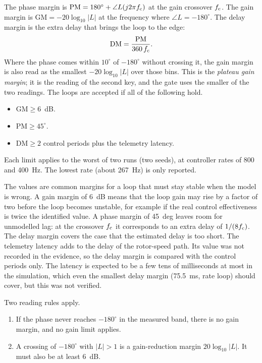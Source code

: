 The phase margin is $\mathrm{PM}=180^\circ+\angle L(j2\pi f_{\mathrm{c}})$ at the gain crossover $f_{\mathrm{c}}$.
The gain margin is $\mathrm{GM}=-20\log_{10}|L|$ at the frequency where $\angle L=-180^\circ$.
The delay margin is the extra delay that brings the loop to the edge:
\begin{equation}\label{eq:an_dm}
  \mathrm{DM} = \frac{\mathrm{PM}}{360\,f_{\mathrm{c}}} .
\end{equation}
Where the phase comes within $10^\circ$ of $-180^\circ$ without crossing it, the gain margin is also read as the smallest $-20\log_{10}|L|$ over those bins.
This is the \emph{plateau gain margin}; it is the reading of the second key, and the gate uses the smaller of the two readings.
The loops are accepted if all of the following hold.
\begin{itemize}
  \item $\mathrm{GM}\ge 6$~dB.
  \item $\mathrm{PM}\ge 45^\circ$.
  \item $\mathrm{DM}\ge 2$ control periods plus the telemetry latency.
\end{itemize}
Each limit applies to the worst of two runs (two seeds), at controller rates of 800 and 400~Hz.
The lowest rate (about 267~Hz) is only reported.

The values are common margins for a loop that must stay stable when the model is wrong.
A gain margin of 6~dB means that the loop gain may rise by a factor of two before the loop becomes unstable, for example if the real control effectiveness is twice the identified value.
A phase margin of 45~deg leaves room for unmodelled lag: at the crossover $f_{\mathrm{c}}$ it corresponds to an extra delay of $1/(8f_{\mathrm{c}})$.
The delay margin covers the case that the estimated delay is too short.
The telemetry latency adds to the delay of the rotor-speed path.
Its value was not recorded in the evidence, so the delay margin is compared with the control periods only.
The latency is expected to be a few tens of milliseconds at most in the simulation, which even the smallest delay margin (75.5~ms, rate loop) should cover, but this was not verified.

Two reading rules apply.
\begin{enumerate}
  \item If the phase never reaches $-180^\circ$ in the measured band, there is no gain margin, and no gain limit applies.
  \item A crossing of $-180^\circ$ with $|L|>1$ is a gain-reduction margin $20\log_{10}|L|$.
    It must also be at least 6~dB.
\end{enumerate}

